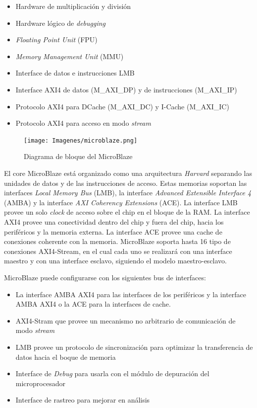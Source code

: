 \documentclass[a4paper,openright,12pt]{report}
\begin{document}
\begin{itemize}
\item Hardware de multiplicación y división
\item Hardware lógico de \textit{debugging}
\item \textit{Floating Point Unit} (FPU)
\item \textit{Memory Management Unit} (MMU)
\item Interface de datos e instrucciones LMB
\item Interface AXI4 de datos (M\_AXI\_DP) y de instrucciones (M\_AXI\_IP) 
\item Protocolo AXI4 para D\-Cache (M\_AXI\_DC) y I-Cache (M\_AXI\_IC)
\item Protocolo AXI4 para acceso en modo \textit{stream}

\end{itemize}


\begin{figure}[H]
\centering
\texttt{[image: Imagenes/microblaze.png]}
\caption{Diagrama de bloque del MicroBlaze \label{overflow}}
   \label{MicroB}
   \end{figure}
   

El core MicroBlaze está organizado como una arquitectura \textit{Harvard} separando las unidades  de datos y de las instrucciones de acceso. Estas memorias soportan  las interfaces \textit{Local Memory Bus} (LMB), la interface \textit{Advanced Extensible Interface 4} (AMBA)   y la interface \textit{AXI Coherency Extensions} (ACE).
La interface LMB provee un solo \textit{clock} de acceso sobre el chip en el bloque de la RAM. La interface  AXI4 provee una conectividad  dentro del chip y fuera del chip, hacia los periféricos y la memoria externa. La interface ACE provee una cache de conexiones coherente con la memoria. MicroBlaze  soporta hasta 16 tipo de conexiones AXI4-Stream, en el cual cada uno se realizará con una interface maestro y con una interface esclavo, siguiendo el modelo maestro-esclavo.

MicroBlaze puede configurarse con los siguientes bus de interfaces:
\begin{itemize}
\item La interface AMBA AXI4 para las interfaces de los periféricos y la interface AMBA AXI4 o la ACE  para la interfaces de cache.
\item AXI4-Stram  que provee un mecanismo no arbitrario de comunicación de modo \textit{stream}
\item LMB  provee un protocolo de sincronización para optimizar la transferencia de datos hacia el boque de memoria
\item Interface de \textit{Debug} para usarla con el módulo de depuración  del microprocesador 
\item Interface de rastreo para mejorar en análisis 
\end{itemize}
\end{document}
